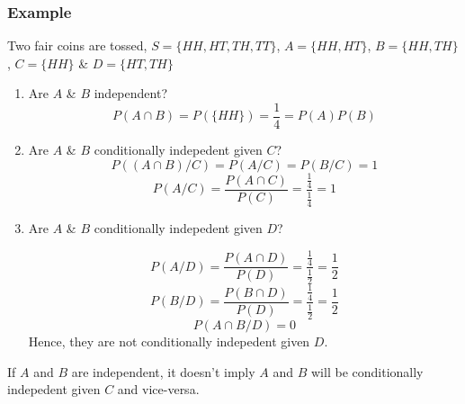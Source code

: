 \documentclass{article}
\begin{document}
\subsubsection{Example}
Two fair coins are tossed, $S=\{HH, HT, TH, TT \}$, $A=\{HH, HT \} $, $B=\{HH, TH\} $, $C=\{HH \}$ \& $D=\{HT, TH\}$

\begin{enumerate}
    \item Are $A$ \& $B$ independent?
    $$ P(A \cap B)= P(\{HH\}) = \frac{1}{4}= P(A)P(B)$$
    \item  Are $A$ \& $B$ conditionally indepedent given $C$?
    $$ P((A \cap B) /C)= P(A/C)=P(B/C)= 1$$
    $$ P(A/C)= \frac{P(A \cap C)}{P(C)}= \frac{\frac{1}{4}}{\frac{1}{4}}= 1$$
    \item Are $A$ \& $B$ conditionally indepedent given $D$?

    $$P(A/D)= \frac{P(A\cap D)}{P(D)}= \frac{\frac{1}{4}}{\frac{1}{2}}=\frac{1}{2} $$
    $$P(B/D)= \frac{P(B\cap D)}{P(D)}= \frac{\frac{1}{4}}{\frac{1}{2}}=\frac{1}{2} $$
    $$ P(A\cap B /D)= 0$$
    Hence, they are not conditionally indepedent given $D$.
\end{enumerate}

If $A$ and $B$ are independent, it doesn't imply $A$ and $B$ will be conditionally indepedent given $C$ and vice-versa.
\end{document}
